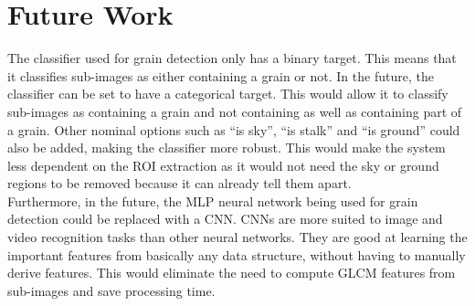 \section{Future Work}
The classifier used for grain detection only has a binary target. This means that it classifies sub-images as either containing a grain or not. In the future, the classifier can be set to have a categorical target. This would allow it to classify sub-images as containing a grain and not containing as well as containing part of a grain. Other nominal options such as ``is sky'', ``is stalk'' and ``is ground'' could also be added, making the classifier more robust. This would make the system less dependent on the ROI extraction as it would not need the sky or ground regions to be removed because it can already tell them apart.\\ 
%
Furthermore, in the future, the MLP neural network being used for grain detection could be replaced with a CNN. CNNs are more suited to image and video recognition tasks than other neural networks. They are good at learning the important features from basically any data structure, without having to manually derive features. This would eliminate the need to compute GLCM features from sub-images and save processing time.

\def\baselinestretch{1.66}





